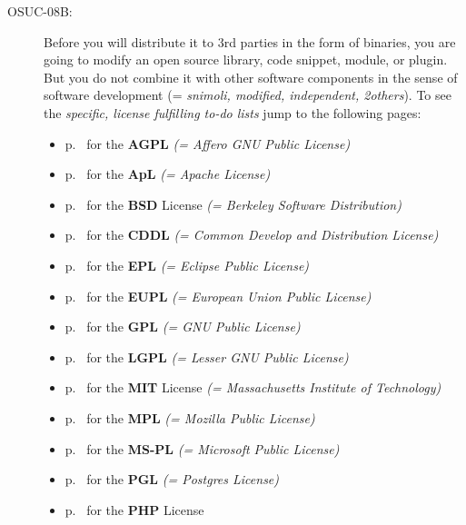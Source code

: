 \begin{description}
\item[OSUC-08B:]\label{OSUC-08B-DEF} Before you will distribute it to 3rd
parties in the form of binaries, you are going to modify an open source library,
code snippet, module, or plugin. But you do not combine it with other software
components in the sense of software development (= \textit{snimoli, modified,
independent, 2others}). To see the \textit{specific, license fulfilling to-do
lists} jump to the following pages:
  \begin{itemize}
    \item p.\ \pageref{OSUC-08B-AGPL} for the \textbf{AGPL}
      \textit{(= Affero GNU Public License)} 
    \item p.\ \pageref{OSUC-08B-Apache20} for the \textbf{ApL}
      \textit{(= Apache License)}
    \item p.\ \pageref{OSUC-08B-BSD} for the \textbf{BSD} License
      \textit{(= Berkeley Software Distribution)}
    \item p.\ \pageref{OSUC-08B-CDDL} for the \textbf{CDDL}
      \textit{(= Common Develop and Distribution License)}  
    \item p.\ \pageref{OSUC-08B-EPL} for the \textbf{EPL}
      \textit{(= Eclipse Public License)}     
    \item p.\ \pageref{OSUC-08B-EUPL} for the \textbf{EUPL}
      \textit{(= European Union Public License)} 
    \item p.\ \pageref{OSUC-08B-GPL} for the \textbf{GPL}
       \textit{(= GNU Public License)} 
    \item p.\ \pageref{OSUC-08B-LGPL} for the \textbf{LGPL}
      \textit{(= Lesser GNU Public License)}           
    \item p.\ \pageref{OSUC-08B-MIT} for the \textbf{MIT} License
       \textit{(= Massachusetts Institute of Technology)} 
    \item p.\ \pageref{OSUC-08B-MPL} for the \textbf{MPL}
      \textit{(= Mozilla Public License)}     
    \item p.\ \pageref{OSUC-08B-MS-PL} for the \textbf{MS-PL}
      \textit{(= Microsoft Public License)} 
    \item p.\ \pageref{OSUC-08B-PGL} for the \textbf{PGL}
      \textit{(= Postgres License)} 
    \item p.\ \pageref{OSUC-08B-PHP} for the \textbf{PHP} License 
  \end{itemize}


\end{description}
